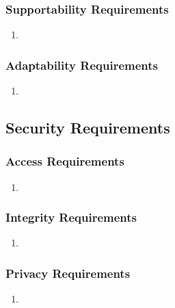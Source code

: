 \documentclass[]{article}
\begin{document}
\subsubsection{Supportability Requirements}
\label{ssub:supportability_requirements}
\begin{enumerate}[{MS}1. ]
	\item 
\end{enumerate}

\subsubsection{Adaptability Requirements}
\label{ssub:adaptability_requirements}
\begin{enumerate}[{MS}1. ]
	\item 
\end{enumerate}


\subsection{Security Requirements}
\label{sub:security_requirements}

\subsubsection{Access Requirements}
\label{ssub:access_requirements}
\begin{enumerate}[{SR}1. ]
	\item 
\end{enumerate}

\subsubsection{Integrity Requirements}
\label{ssub:integrity_requirements}
\begin{enumerate}[{SR}1. ]
	\item 
\end{enumerate}

\subsubsection{Privacy Requirements}
\label{ssub:privacy_requirements}
\begin{enumerate}[{SR}1. ]
	\item 
\end{enumerate}
\end{document}
